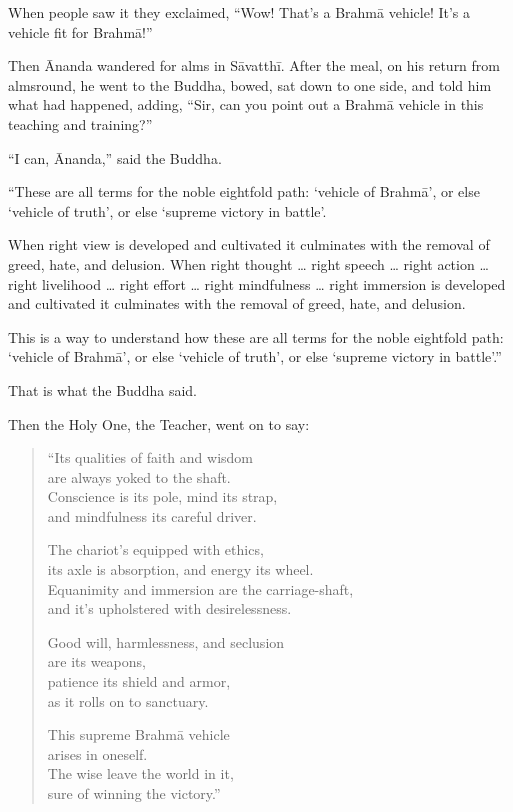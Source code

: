 \documentclass[12pt,openany]{book}%
\begin{document}
When people saw it they exclaimed, “Wow! That’s a \textsanskrit{Brahmā} vehicle! It’s a vehicle fit for \textsanskrit{Brahmā}!” 

Then Ānanda wandered for alms in \textsanskrit{Sāvatthī}. After the meal, on his return from almsround, he went to the Buddha, bowed, sat down to one side, and told him what had happened, adding, “Sir, can you point out a \textsanskrit{Brahmā} vehicle in this teaching and training?” 

“I can, Ānanda,” said the Buddha. 

“These are all terms for the noble eightfold path: ‘vehicle of \textsanskrit{Brahmā}’, or else ‘vehicle of truth’, or else ‘supreme victory in battle’. 

When right view is developed and cultivated it culminates with the removal of greed, hate, and delusion. When right thought … right speech … right action … right livelihood … right effort … right mindfulness … right immersion is developed and cultivated it culminates with the removal of greed, hate, and delusion. 

This is a way to understand how these are all terms for the noble eightfold path: ‘vehicle of \textsanskrit{Brahmā}’, or else ‘vehicle of truth’, or else ‘supreme victory in battle’.” 

That is what the Buddha said. 

Then the Holy One, the Teacher, went on to say: 

\begin{verse}%
“Its qualities of faith and wisdom \\
are always yoked to the shaft. \\
Conscience is its pole, mind its strap, \\
and mindfulness its careful driver. 

The chariot’s equipped with ethics, \\
its axle is absorption, and energy its wheel. \\
Equanimity and immersion are the carriage-shaft, \\
and it’s upholstered with desirelessness. 

Good will, harmlessness, and seclusion \\
are its weapons, \\
patience its shield and armor, \\
as it rolls on to sanctuary. 

This supreme \textsanskrit{Brahmā} vehicle \\
arises in oneself. \\
The wise leave the world in it, \\
sure of winning the victory.” 

%
\end{verse}
\end{document}
